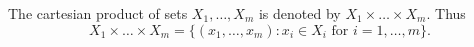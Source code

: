 The cartesian product of sets $X_1, \ldots, X_m$ is denoted by $X_1 \times \ldots \times X_m$. Thus
$$X_1 \times \ldots \times X_m = \{(x_1, \ldots, x_m): x_i \in X_i \text{ for } i = 1, \ldots, m\}.$$
